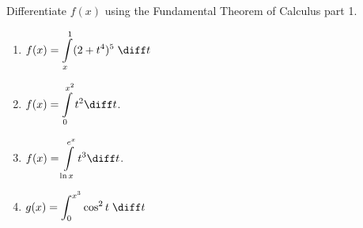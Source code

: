Differentiate $f(x)$ using the Fundamental Theorem of Calculus part 1.
\begin{enumerate}[ref={\fcProblemRef}]
\item\label{problemDifferentiateFTC1int_x^1(2+t^4)^5dt}  ${\displaystyle f(x) = \int\limits_x^1 (2+t^4)^5 \; \diff t}$


\item  $\displaystyle f(x)=\int\limits_{0}^{x^2} t^2\diff t $.

\item \label{problemd/dx(int_(ln x)^(e^x)t^3dt)} $\displaystyle f(x)=\int\limits_{\ln x}^{e^x} t^3\diff t $.


\item ${\displaystyle g(x) = \int_{0}^{x^3} \cos^2 t \; \diff t}$


\end{enumerate}